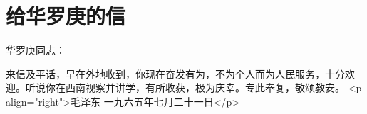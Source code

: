 \section[给华罗庚的信（一九六五年七月二十一日）]{给华罗庚的信}


华罗庚同志：

来信及平话，早在外地收到，你现在奋发有为，不为个人而为人民服务，十分欢迎。听说你在西南视察并讲学，有所收获，极为庆幸。专此奉复，敬颂教安。
<p align="right">毛泽东
一九六五年七月二十一日</p>


